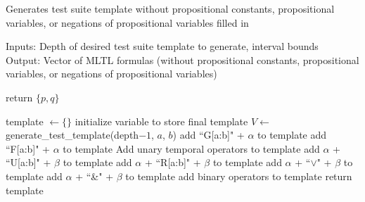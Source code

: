 \documentclass[runningheads]{llncs}
\begin{document}
\begin{algorithm}[H]
    \caption{Generates test suite template without propositional constants, propositional variables, or negations of propositional variables filled in}
    Inputs: Depth of desired test suite template to generate, interval bounds\\
    Output: Vector of MLTL formulas (without propositional constants, propositional variables, or negations of propositional variables)
    \begin{algorithmic}
            \State return $\{p, q\}$
        \EndIf
        
        \State template $\leftarrow \{\}$
        \Comment initialize variable to store final template
        \State $V \leftarrow$ generate\_test\_template(depth$- 1$, $a$, $b$)
            \State add ``G[a:b]" + $\alpha$ to template
            \State add ``F[a:b]" + $\alpha$ to template
            \Comment Add unary temporal operators to template
                \State add $\alpha$ + ``U[a:b]" + $\beta$ to template
                \State add  $\alpha$ + ``R[a:b]" + $\beta$ to template
                \State add $\alpha$ + ``$\lor$" + $\beta$ to template
                \State add $\alpha$ + ``\&" + $\beta$ to template
                \Comment add binary operators to template
            \EndFor
        \EndFor
        \State return template
    \EndProcedure
    \end{algorithmic}
    
\end{algorithm}
\end{document}
